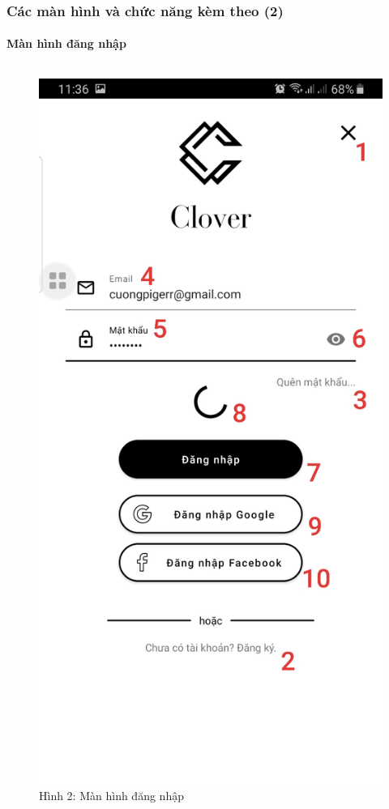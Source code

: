 \documentclass{beamer}
\begin{document}
\begin{frame}
    \frametitle{Các màn hình và chức năng kèm theo (2)}
    \framesubtitle{Màn hình đăng nhập}

    \begin{columns}
        \begin{figure}
            \centering
            \includegraphics[height=0.7\textheight]{images/02.png}
            \caption{\centering\tiny{Hình 2: Màn hình đăng nhập}}


\end{figure}
\end{columns}
\end{frame}
\end{document}
